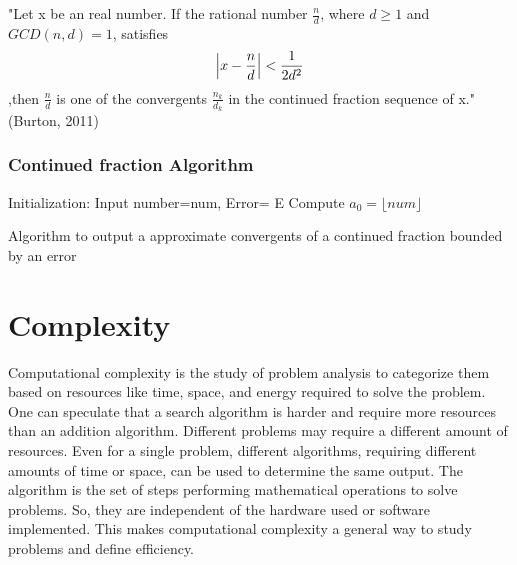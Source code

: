 \begin{lemma}
    "Let x be an real number. If the rational number $\frac{n}{d}$, where $d \geq 1$ and $GCD(n,d)=1$, satisfies 
    \begin{equation}
        \abs{x- \frac{n}{d}} < \frac{1}{2d^2}
    \end{equation}
    ,then $\frac{n}{d}$ is one of the convergents $\frac{n_k}{d_k}$ in the continued fraction sequence of x." \cite{burton2011}(Burton, 2011)
    \label{th: approx_cont_frac}
\end{lemma}



\subsubsection{Continued fraction Algorithm}

\begin{algorithm}[H]
  Initialization: Input number=num, Error= E \;
  Compute $a_0 = \lfloor num \rfloor$\;
  \caption{Algorithm to output a approximate convergents of a continued fraction bounded by an error}
  \label{algo: Continued_fraction_Alorithm}
\end{algorithm}

\section{Complexity}
Computational complexity is the study of problem analysis to categorize them based on resources like time, space, and energy required to solve the problem.\cite{Nielsen2002} One can speculate that a search algorithm is harder and require more resources than an addition algorithm. Different problems may require a different amount of resources. Even for a single problem, different algorithms, requiring different amounts of time or space, can be used to determine the same output. The algorithm is the set of steps performing mathematical operations to solve problems. So, they are independent of the hardware used or software implemented. This makes computational complexity a general way to study problems and define efficiency.

